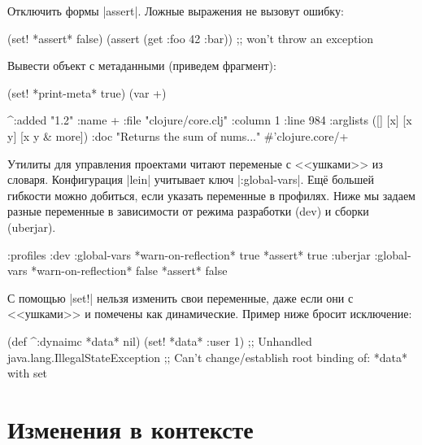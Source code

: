 \noindent
Отключить формы \spverb|assert|. Ложные выражения не вызовут ошибку:

\begin{english}
  \begin{clojure}
(set! *assert* false)
(assert (get {:foo 42} :bar))
;; won't throw an exception
  \end{clojure}
\end{english}

\noindent
Вывести объект с метаданными (приведем фрагмент):

\begin{english}
  \begin{clojure}
(set! *print-meta* true)
(var +)

^{:added "1.2"
  :name +
  :file "clojure/core.clj"
  :column 1
  :line 984
  :arglists ([] [x] [x y] [x y & more])
  :doc "Returns the sum of nums..."}
#'clojure.core/+
  \end{clojure}
\end{english}

Утилиты для управления проектами читают переменые с <<ушками>> из
словаря. Конфигурация \spverb|lein| учитывает ключ \spverb|:global-vars|. Ещ\"{е}
большей гибкости можно добиться, если указать переменные в профилях. Ниже мы
задаем разные переменные в зависимости от режима разработки (dev) и сборки
(uberjar).

\begin{english}
  \begin{clojure}
{:profiles
 :dev {:global-vars {*warn-on-reflection* true
                     *assert* true}}
 :uberjar {:global-vars {*warn-on-reflection* false
                         *assert* false}}}
  \end{clojure}
\end{english}

С помощью \spverb|set!| нельзя изменить свои переменные, даже если они с
<<ушками>> и помечены как динамические. Пример ниже бросит исключение:

\begin{english}
  \begin{clojure}
(def ^:dynaimc *data* nil)
(set! *data* {:user 1})
;; Unhandled java.lang.IllegalStateException
;; Can't change/establish root binding of: *data* with set
  \end{clojure}
\end{english}

\section{Изменения в контексте}

